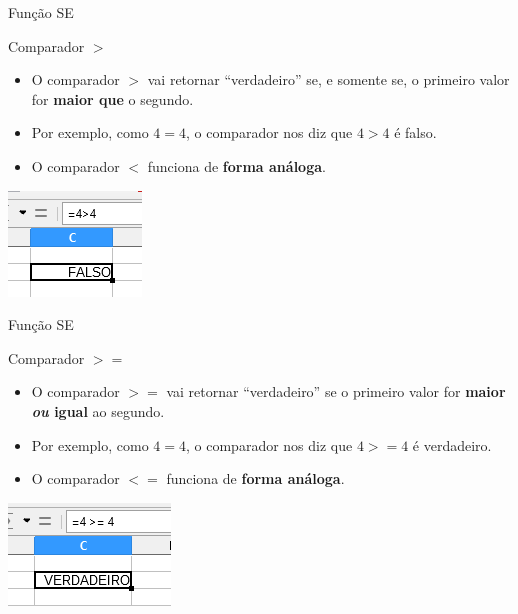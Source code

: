 \begin{frame}{Função SE}
	\begin{block}{Comparador $ > $}
		\begin{itemize}
			\item O comparador $ > $ vai retornar ``verdadeiro'' se, e somente se, o primeiro valor for \textbf{maior que} o segundo.
			\item Por exemplo, como $4=4$, o comparador nos diz que $ 4>4 $ é falso.
			\item O comparador $ < $ funciona de \textbf{forma análoga}.
		\end{itemize}
	\end{block}
	
	\centering
	\includegraphics[width=0.5\linewidth]{Figuras/Ch06/fig44.14}
\end{frame}


\begin{frame}{Função SE}
	\begin{block}{Comparador $ >= $}
		\begin{itemize}
			\item O comparador $ >= $ vai retornar ``verdadeiro'' se o primeiro valor for \textbf{maior \textit{ou} igual} ao segundo.
			\item Por exemplo, como $4=4$, o comparador nos diz que $ 4>=4 $ é verdadeiro.
			\item O comparador $ <= $ funciona de \textbf{forma análoga}.
		\end{itemize}
	\end{block}
	
	\centering
	\includegraphics[width=0.5\linewidth]{Figuras/Ch06/fig44.15}
\end{frame}


